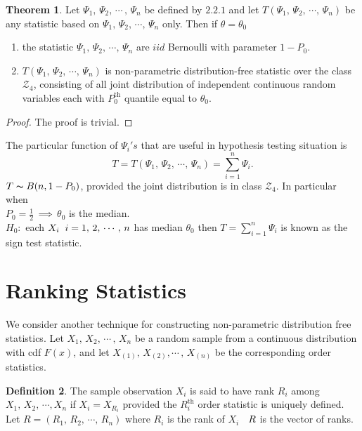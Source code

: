 \documentclass[12pt,a4paper]{report}
\theoremstyle{definition}
\newtheorem{thm}{Theorem}[section]
\newtheorem{defn}[thm]{Definition}
\theoremstyle{plain}
\begin{document}
 
 
\begin{thm}
 Let $\Psi_1, \, \Psi_2, \, \cdots\, , \, \Psi_n$ be defined by $2.2.1$ and let $T(\Psi_1, \, \Psi_2, \, \cdots, \, \Psi_n)$ be any statistic based on $\Psi_1, \, \Psi_2, \, \cdots, \, \Psi_n$ only. Then if $\theta = \theta_0$
 \begin{enumerate}
 \item[(i)] the statistic $\Psi_1, \, \Psi_2, \, \cdots, \, \Psi_n$ are $iid$ Bernoulli with parameter $1 - P_0$.
 \item[(ii)] $T(\Psi_1, \, \Psi_2, \, \cdots, \, \Psi_n)$ is non-parametric distribution-free statistic over the class $\mathscr{Z}_4$, consisting of all joint distribution of independent continuous random variables each with $P_0^{\text{th}}$ quantile equal to $\theta_0$.
 \end{enumerate}
\end{thm}

\begin{proof}
The proof is trivial.
\end{proof}

The particular function of $\Psi_i's$ that are useful in hypothesis testing situation is 
$$T = T(\Psi_1, \, \Psi_2, \, \cdots, \, \Psi_n) = \sum^n_{i = 1} \Psi_i.$$
$T\thicksim B(n, 1 - P_0)$, provided the joint distribution is in class $\mathscr{Z}_4$. In particular when\\ $P_0 = \frac{1}{2}\, \implies\, \theta_0$ is the median.\\
$H_0: $ each $X_i \hspace{0.2cm} i = 1, \, 2, \, \cdots,\, n$ has median $\theta_0$ then $T = \sum^n_{i = 1}\Psi_i$ is known as the sign test statistic.
 
 


\section{Ranking Statistics} 
We consider another technique for constructing non-parametric distribution free statistics. Let $X_1, \, X_2, \, \cdots\, ,\, X_n$ be a random sample from a continuous distribution with cdf $F(x)$, and let $X_{(1)}, \, X_{(2)}, \cdots\,, \, X_{(n)}$ be the corresponding order statistics.
 

\begin{defn} 
The sample observation $X_i$ is said to have rank $R_i$ among $X_1, \, X_2, \, \cdots, X_n$ if $X_i = X_{R_i}$ provided the $R_i^{\text{th}}$ order statistic is uniquely defined.\\
Let $R = (R_1,\, R_2, \, \cdots, \, R_n)$ where $R_i$ is the rank of $X_i$ $\hspace{0.2cm} R$ is the vector of ranks.
\end{defn}
\end{document}
